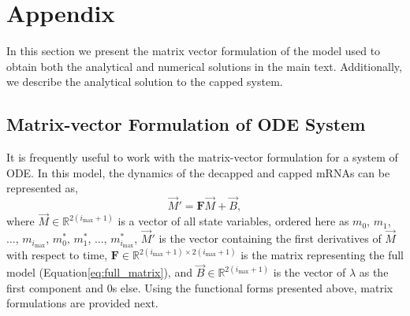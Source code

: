 \documentclass[a4,center,fleqn]{NAR}
\newcommand{\imax}{\ensuremath{{i_{\max}}}\xspace}
\let\bs\boldsymbol
\begin{document}
%


 


\section{Appendix}

In this section we present the matrix vector formulation of the model used to obtain both the analytical and numerical solutions in the main text. Additionally, we describe the analytical solution to the capped system. 


\subsection{Matrix-vector Formulation of ODE System}
It is frequently useful to work with the matrix-vector formulation for a system of ODE.
In this model, the dynamics of the decapped and capped mRNAs can be represented as,
\begin{equation}
\vec{M}'=\boldsymbol{F}\vec{M}+\vec{B},
\end{equation} 
where $\vec{M}\in\mathbb{R}^{2(\imax+1)}$ is a vector of all state variables, ordered here as $m_0$, $m_1$, ..., $m_{\imax}$, $m^*_0$, $m^*_1$, ..., $m^*_{\imax}$, $\vec{M}'$ is the vector containing the first derivatives of $\vec{M}$ with respect to time, $\bs{F}\in\mathbb{R}^{2(\imax+1)\times 2(\imax+1)}$ is the matrix representing the full model (Equation\ref{eq:full_matrix}), and $\vec{B}\in\mathbb{R}^{2(\imax+1)}$ is the vector of $\lambda$ as the first component and 0s else.
Using the functional forms presented above, matrix formulations are provided next.
\end{document}
